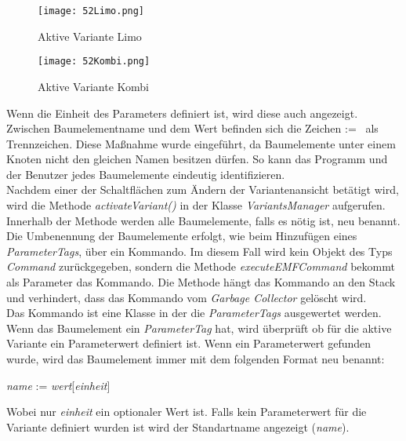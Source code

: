 \begin{figure}[h!]
\centering
\begin{minipage}{.5\textwidth}
  \centering
  \texttt{[image: 52Limo.png]}
  \caption{Aktive Variante Limo}
  \label{ttn.52Limo}
\end{minipage}%
\begin{minipage}{.5\textwidth}
  \centering
  \texttt{[image: 52Kombi.png]}
  \caption{Aktive Variante Kombi}
  \label{ttn.52Kombi}
\end{minipage}
\end{figure}


Wenn die Einheit des Parameters definiert ist, wird diese auch angezeigt. Zwischen Baumelementname und dem Wert befinden sich die Zeichen \glqq :=\grqq~ als Trennzeichen. Diese Maßnahme wurde eingeführt, da Baumelemente unter einem Knoten nicht den gleichen Namen besitzen dürfen. So kann das Programm und der Benutzer jedes Baumelemente eindeutig identifizieren.\\


Nachdem einer der Schaltflächen zum Ändern der Variantenansicht betätigt wird, wird die Methode \textit{activateVariant()} in der Klasse \textit{VariantsManager} aufgerufen. Innerhalb der Methode werden alle Baumelemente, falls es nötig ist, neu benannt. \\


Die Umbenennung der Baumelemente erfolgt, wie beim Hinzufügen eines \textit{ParameterTags}, über ein Kommando. Im diesem Fall wird kein Objekt des Typs \textit{Command} zurückgegeben, sondern die Methode \textit{executeEMFCommand} bekommt als Parameter das Kommando. Die Methode hängt das Kommando an den Stack und verhindert, dass das Kommando vom \textit{Garbage Collector} gelöscht wird.\\


Das Kommando ist eine Klasse in der die \textit{ParameterTags} ausgewertet werden. Wenn das Baumelement ein \textit{ParameterTag} hat, wird überprüft ob für die aktive Variante ein Parameterwert definiert ist. Wenn ein Parameterwert gefunden wurde, wird das Baumelement immer mit dem folgenden Format neu benannt:

\begin{center}
\textit{name} := \textit{wert}[\textit{einheit}]
\end{center}

Wobei nur \textit{einheit} ein optionaler Wert ist. Falls kein Parameterwert für die Variante definiert wurden ist wird der Standartname angezeigt (\textit{name}).\\


